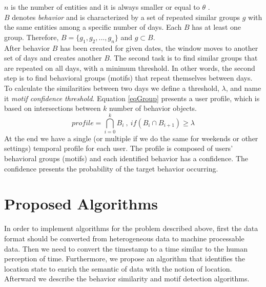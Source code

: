 \documentclass{sig-alternate}
\begin{document}
$n$ is the number of entities and it is always smaller or equal to $\theta$ .\\
$B$ denotes \emph{behavior} and is characterized by a set of repeated similar groups $g$ with the same entities among a specific number of days. Each $B$ has at least one group. Therefore, $B=\{g_1,g_2,..., g_n\} $ and $g \subset B$.\\
After behavior $B$ has been created for given dates, the window moves to another set of days and creates another $B$. The second task is to find similar groups that are repeated on all days, with a minimum threshold. In other words, the second step is to find behavioral groups (motifs) that repeat themselves between days. To calculate the similarities between two days we define a threshold, $\lambda$, and name it \emph{motif confidence threshold}. Equation \ref{eqGroup} presents a user profile, which is based on intersections between $k$ number of behavior objects. 
\begin{equation}\label{eqGroup}
	profile = \bigcap_{i=0}^{k} B_i  {\ }, {\ } if (B_i\cap{B_{i+1}}) \geq \lambda 
\end{equation}
At the end we have a single (or multiple if we do the same for weekends or other settings) temporal profile for each user. The profile is composed of users' behavioral groups (motifs) and each identified behavior has a confidence. The confidence presents the probability of the target behavior occurring.
\vspace{-0.1cm}
\section{Proposed Algorithms}
In order to implement algorithms for the problem described above, first the data format should be converted from heterogeneous data to machine processable data. Then we need to convert the timestamp to a time similar to the human perception of time. Furthermore, we propose an algorithm that identifies the location state to enrich the semantic of data with the notion of location. Afterward we describe the behavior similarity and motif detection algorithms. 
\end{document}

